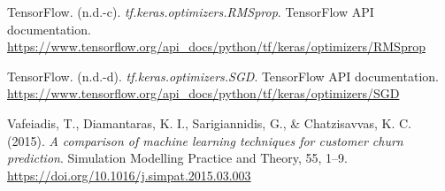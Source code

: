 \documentclass[11pt]{article}
\begin{document}
\begin{thebibliography}{}
TensorFlow. (n.d.-c).
\textit{tf.keras.optimizers.RMSprop}.
TensorFlow API documentation.
\url{https://www.tensorflow.org/api_docs/python/tf/keras/optimizers/RMSprop}

TensorFlow. (n.d.-d).
\textit{tf.keras.optimizers.SGD}.
TensorFlow API documentation.
\url{https://www.tensorflow.org/api_docs/python/tf/keras/optimizers/SGD}

Vafeiadis, T., Diamantaras, K. I., Sarigiannidis, G., \& Chatzisavvas, K. C. (2015).
\textit{A comparison of machine learning techniques for customer churn prediction}.
Simulation Modelling Practice and Theory, 55, 1--9.
\url{https://doi.org/10.1016/j.simpat.2015.03.003}

\end{thebibliography}
\end{document}
